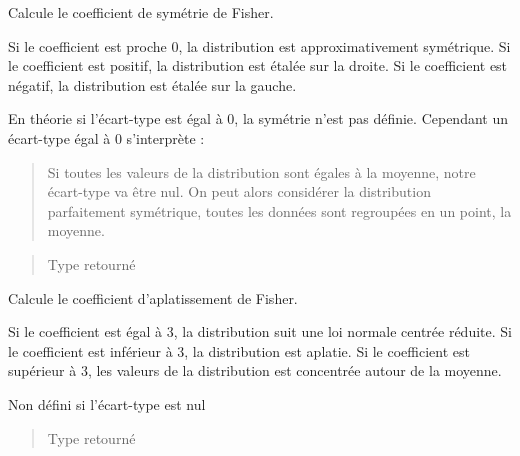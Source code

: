\documentclass[letterpaper,10pt,openany,oneside,french]{sphinxmanual}
\begin{document}

\begin{fulllineitems}
\label{\detokenize{addQuantitativesDiscretes:add.addQuantitativesDiscretes.symetrie}}
Calcule le coefficient de symétrie de Fisher.

Si le coefficient est proche 0, la distribution est approximativement symétrique.
Si le coefficient est positif, la distribution est étalée sur la droite.
Si le coefficient est négatif, la distribution est étalée sur la gauche.

En théorie si l’écart-type est égal à 0, la symétrie n’est pas définie.
Cependant un écart-type égal à 0 s’interprète :
\begin{quote}

Si toutes les valeurs de la distribution sont égales à la moyenne, notre écart-type va être nul.
On peut alors considérer la distribution parfaitement symétrique, toutes les données sont regroupées en un point, la moyenne.
\end{quote}
\begin{quote}\begin{description}
\item[{Type retourné}] \leavevmode
{}

\end{description}\end{quote}

\end{fulllineitems}


\begin{fulllineitems}
\label{\detokenize{addQuantitativesDiscretes:add.addQuantitativesDiscretes.aplatissement}}
Calcule le coefficient d’aplatissement de Fisher.

Si le coefficient est égal à 3, la distribution suit une loi normale centrée réduite.
Si le coefficient est inférieur à 3, la distribution est aplatie.
Si le coefficient est supérieur à 3, les valeurs de la distribution est concentrée autour de la moyenne.

Non défini si l’écart-type est nul
\begin{quote}\begin{description}
\item[{Type retourné}] \leavevmode
{}

\end{description}\end{quote}

\end{fulllineitems}
\end{document}
